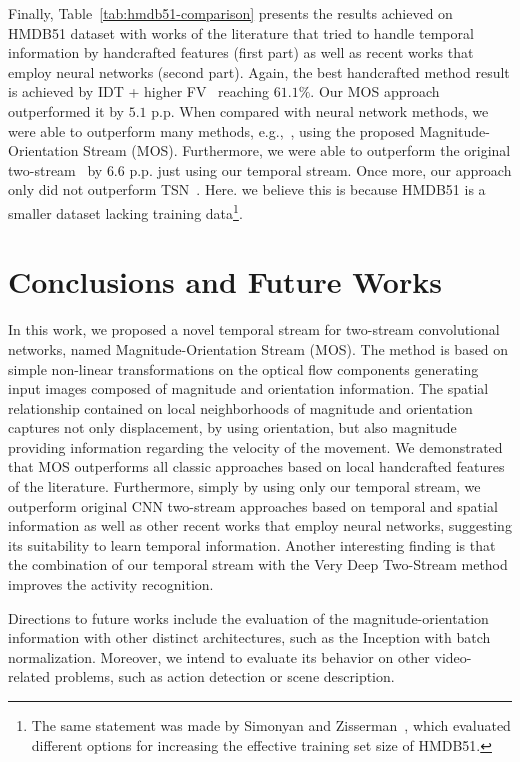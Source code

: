 \documentclass[10pt,conference]{IEEEtran}
\begin{document}
Finally, Table~\ref{tab:hmdb51-comparison} presents the results achieved on HMDB51 dataset with works of the literature that tried to handle temporal information by handcrafted features (first part) as well as recent works that employ neural networks (second part). Again, the best handcrafted method result is achieved by IDT + higher FV~\cite{Peng:2016} reaching $61.1\%$. Our MOS approach outperformed it by $5.1$ p.p. When compared with neural network methods, we were able to outperform many methods, e.g.,~\cite{Karpathy:2014, Srivastava:2015, Tran:2015, Sun:2015, Simonyan:2014, Zhu:2016}, using the proposed Magnitude-Orientation Stream (MOS). Furthermore, we were able to outperform the original two-stream~\cite{Simonyan:2014} by $6.6$ p.p. just using our temporal stream. Once more, our approach only did not outperform TSN~\cite{Wang:2016}. Here. we believe this is because HMDB51 is a smaller dataset lacking training data\footnote{The same statement was made by Simonyan and Zisserman~\cite{Simonyan:2014}, which evaluated different options for increasing the effective training set size of HMDB51.}.

%
\section{Conclusions and Future Works}\label{conclusions}

In this work, we proposed a novel temporal stream for two-stream convolutional networks, named Magnitude-Orientation Stream (MOS). The method is based on simple non-linear transformations on the optical flow components generating input images composed of magnitude and orientation information. The spatial relationship contained on local neighborhoods of magnitude and orientation captures not only displacement, by using orientation, but also magnitude providing information regarding the velocity of the movement. We demonstrated that MOS outperforms all classic approaches based on local handcrafted features of the literature. Furthermore, simply by using only our temporal stream, we outperform original CNN two-stream approaches based on temporal and spatial information as well as other recent works that employ neural networks, suggesting its suitability to learn temporal information. Another interesting finding is that the combination of our temporal stream with the Very Deep Two-Stream method improves the activity recognition.

Directions to future works include the evaluation of the magnitude-orientation information with other distinct architectures, such as the Inception with batch normalization. Moreover, we intend to evaluate its behavior on other video-related problems, such as action detection or scene description.
\end{document}
